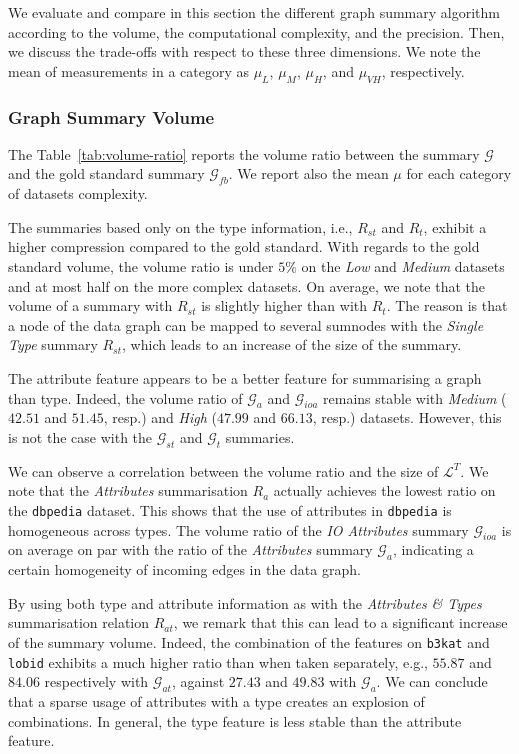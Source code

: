We evaluate and compare in this section the different graph summary algorithm according to the volume, the computational complexity, and the precision. Then, we discuss the trade-offs with respect to these three dimensions.
We note the mean of measurements in a category as $\mu_{L}$, $\mu_{M}$, $\mu_{H}$, and $\mu_{VH}$, respectively.

\subsubsection{Graph Summary Volume}

The Table~\ref{tab:volume-ratio} reports the volume ratio between the summary $\mathcal{G}$ and the gold standard summary $\mathcal{G}_{fb}$. We report also the mean $\mu$ for each category of datasets complexity.

The summaries based only on the type information, i.e., $R_{st}$ and $R_t$, exhibit a higher compression compared to the gold standard. With regards to the gold standard volume, the volume ratio is under $5\%$ on the \emph{Low} and \emph{Medium} datasets and at most half on the more complex datasets. On average, we note that the volume of a summary with $R_{st}$ is slightly higher than with $R_t$. The reason is that a node of the data graph can be mapped to several sumnodes with the \emph{Single Type} summary $R_{st}$, which leads to an increase of the size of the summary.

The attribute feature appears to be a better feature for summarising a graph than type. Indeed, the volume ratio of $\mathcal{G}_a$ and $\mathcal{G}_{ioa}$ remains stable with \emph{Medium} ($42.51$ and $51.45$, resp.) and \emph{High} ($47.99$ and $66.13$, resp.) datasets. However, this is not the case with the $\mathcal{G}_{st}$ and $\mathcal{G}_t$ summaries. 

We can observe a correlation between the volume ratio and the size of $\mathcal{L}^T$.
We note that the \emph{Attributes} summarisation $R_a$ actually achieves the lowest ratio on the \texttt{dbpedia} dataset. This shows that the use of attributes in \texttt{dbpedia} is homogeneous across types. The volume ratio of the \emph{IO Attributes} summary $\mathcal{G}_{ioa}$ is on average on par with the ratio of the \emph{Attributes} summary $\mathcal{G}_a$, indicating a certain homogeneity of incoming edges in the data graph.

By using both type and attribute information as with the \emph{Attributes \& Types} summarisation relation $R_{at}$, we remark that this can lead to a significant increase of the summary volume. Indeed, the combination of the features on \texttt{b3kat} and \texttt{lobid} exhibits a much higher ratio than when taken separately, e.g., $55.87$ and $84.06$ respectively with $\mathcal{G}_{at}$, against $27.43$ and $49.83$ with $\mathcal{G}_a$. We can conclude that a sparse usage of attributes with a type creates an explosion of combinations. In general, the type feature is less stable than the attribute feature.

